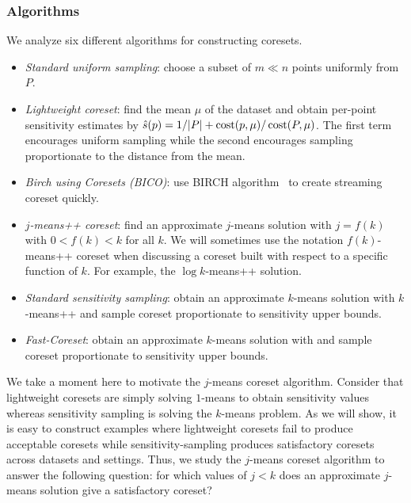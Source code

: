 

\subsubsection{Algorithms}

We analyze six different algorithms for constructing coresets.
\begin{itemize}
        \item \emph{Standard uniform sampling}: choose a subset of $m \ll n$ points uniformly from $P$.
        \item \emph{Lightweight coreset}: find the mean $\mu$ of the dataset and obtain per-point sensitivity estimates by $\hat{s}(p) = 1/|P| + \operatorname{cost}(p, \mu) / \operatorname{cost}(P, \mu)$.
            The first term encourages uniform sampling while the second encourages sampling proportionate to the distance from the mean.
        \item \emph{Birch using Coresets (BICO)}: use BIRCH algorithm~\cite{birch} to create streaming coreset quickly.
        \item \emph{$j$-means++ coreset}: find an approximate $j$-means solution with $j = f(k)$ with $0 < f(k) < k$ for all $k$. We will sometimes use the notation
            $f(k)$-means++ coreset when discussing a coreset built with respect to a specific function of $k$. For example, the $\log k$-means++ solution.
        \item \emph{Standard sensitivity sampling}: obtain an approximate $k$-means solution with $k$-means++ and sample coreset proportionate to sensitivity upper bounds.
        \item \emph{Fast-Coreset}: obtain an approximate $k$-means solution with \fkmeans and sample coreset proportionate to sensitivity upper bounds.

\end{itemize}

We take a moment here to motivate the $j$-means coreset algorithm.  Consider that lightweight coresets are simply solving $1$-means to obtain sensitivity values
whereas sensitivity sampling is solving the $k$-means problem.  As we will show, it is easy to construct examples where lightweight coresets fail to produce
acceptable coresets while sensitivity-sampling produces satisfactory coresets across datasets and settings. Thus, we study the $j$-means coreset
algorithm to answer the following question: for which values of $j < k$ does an approximate $j$-means solution give a satisfactory coreset?

